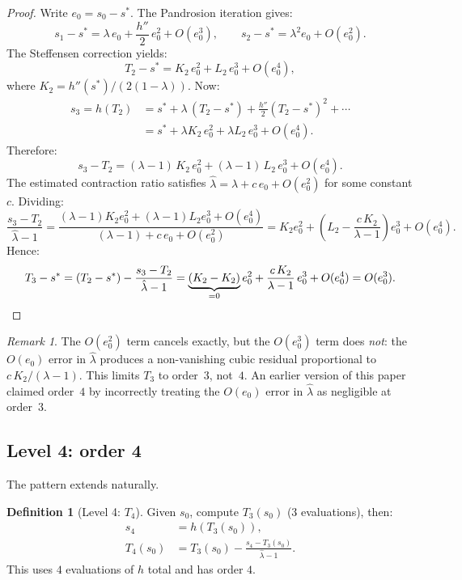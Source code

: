 \documentclass[10pt,a4paper,oneside]{book}
\theoremstyle{definition}
\newtheorem{definition}[theorem]{Definition}
\theoremstyle{remark}
\newtheorem{remark}[theorem]{Remark}
\begin{document}
\begin{proof}
Write $e_0 = s_0 - s^*$.  The Pandrosion iteration gives:
\[
  s_1 - s^* = \lambda\, e_0 + \frac{h''}{2}\,e_0^2 + O(e_0^3),
  \qquad
  s_2 - s^* = \lambda^2 e_0 + O(e_0^2).
\]
The Steffensen correction yields:
\[
  T_2 - s^* = K_2 \, e_0^2 + L_2 \, e_0^3 + O(e_0^4),
\]
where $K_2 = h''(s^*)/(2(1-\lambda))$.  Now:
\begin{align*}
  s_3 = h(T_2) &= s^* + \lambda\,(T_2 - s^*) + \frac{h''}{2}(T_2 - s^*)^2 + \cdots \\
  &= s^* + \lambda K_2\, e_0^2 + \lambda L_2\, e_0^3 + O(e_0^4).
\end{align*}
Therefore:
\[
  s_3 - T_2 = (\lambda - 1)\, K_2\, e_0^2 + (\lambda - 1)\, L_2\, e_0^3 + O(e_0^4).
\]
The estimated contraction ratio satisfies $\hat{\lambda} = \lambda + c\, e_0 + O(e_0^2)$ for some constant $c$.  Dividing:
\[
  \frac{s_3 - T_2}{\hat{\lambda} - 1}
  = \frac{(\lambda - 1)K_2 e_0^2 + (\lambda - 1)L_2 e_0^3 + O(e_0^4)}{(\lambda - 1) + c\,e_0 + O(e_0^2)}
  = K_2 e_0^2 + \left(L_2 - \frac{c\,K_2}{\lambda - 1}\right) e_0^3 + O(e_0^4).
\]
Hence:
\[
  T_3 - s^* = (T_2 - s^*) - \frac{s_3 - T_2}{\hat{\lambda} - 1}
  = \underbrace{(K_2 - K_2)}_{=0} e_0^2 + \frac{c\,K_2}{\lambda - 1}\, e_0^3 + O(e_0^4)
  = O(e_0^3). \qedhere
\]
\end{proof}

\begin{remark}
The $O(e_0^2)$ term cancels exactly, but the $O(e_0^3)$ term does \emph{not}: the $O(e_0)$ error in $\hat{\lambda}$ produces a non-vanishing cubic residual proportional to $c\,K_2/(\lambda - 1)$.  This limits $T_3$ to order~$3$, not~$4$.  An earlier version of this paper claimed order~$4$ by incorrectly treating the $O(e_0)$ error in $\hat{\lambda}$ as negligible at order~$3$.
\end{remark}

\subsection{Level 4: order 4}

The pattern extends naturally.

\begin{definition}[Level 4: $T_4$]
\label{def:T4}
Given $s_0$, compute $T_3(s_0)$ (3 evaluations), then:
\begin{align}
  s_4 &= h(T_3(s_0)), \label{eq:t4_s4} \\
  T_4(s_0) &= T_3(s_0) - \frac{s_4 - T_3(s_0)}{\hat{\lambda} - 1}. \label{eq:t4}
\end{align}
This uses $4$ evaluations of $h$ total and has order $4$.
\end{definition}
\end{document}
